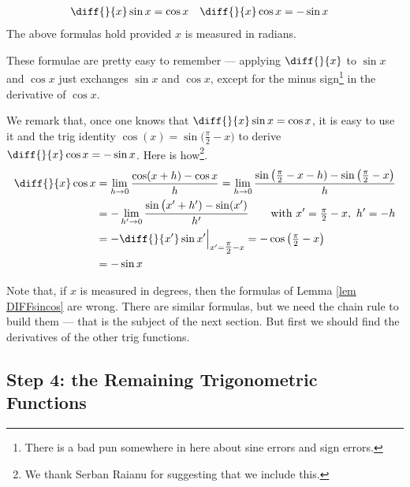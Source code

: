 \begin{lemma}\label{lem DIFFsincos}
\begin{align*}
\diff{}{x}\sin x &=\cos x &
\diff{}{x}\cos x &=-\sin x
\end{align*}
The above formulas hold provided $x$ is measured in radians.
\end{lemma}
These formulae are pretty easy to remember --- applying $\diff{}{x}$
to $\sin x$ and $\cos x$ just exchanges $\sin x$ and $\cos x$, except for
the minus sign\footnote{There is a bad pun somewhere in here about sine errors and sign
errors.} in the derivative of $\cos x$.

\begin{remark}[Optional --- Another derivation of $\diff{}{x}\cos x =-\sin x$]
\label{rem deriv cos prime}

We remark that, once one knows that $\diff{}{x}\sin x =\cos x$, it is easy to use it and the trig identity $\cos(x) = \sin\big(\frac{\pi}{2}-x\big)$ to derive $\diff{}{x}\cos x =-\sin x$. Here is how\footnote{We thank Serban Raianu for suggesting that we include this.}. 
\begin{align*}
\diff{}{x}\cos x
&=\lim_{h\rightarrow 0}\frac{\cos (x+h)-\cos x}{h} 
=\lim_{h\rightarrow 0}\frac{\sin\big(\frac{\pi}{2}-x-h)
        -\sin\big(\frac{\pi}{2}- x\big)}{h} 
\\
&=-\lim_{h'\rightarrow 0}\frac{\sin\big(x'+h')-\sin(x')}{h'} 
\qquad\text{with }x'=\tfrac{\pi}{2}-x,\ h'=-h
\\
&=-\diff{}{x'}\sin x'\Big|_{x'=\tfrac{\pi}{2}-x}
=-\cos\big(\tfrac{\pi}{2}- x\big)
\\
&=-\sin x
\end{align*}  


\end{remark}

Note that, if $x$ is measured in degrees, then the formulas of 
Lemma \ref{lem DIFFsincos} are wrong. There
are similar formulas, but we need the chain rule to build them --- that is the
subject of the next section. But first we should find the
derivatives of the other trig functions.

\goodbreak
\subsection*{Step 4: the Remaining Trigonometric Functions}

